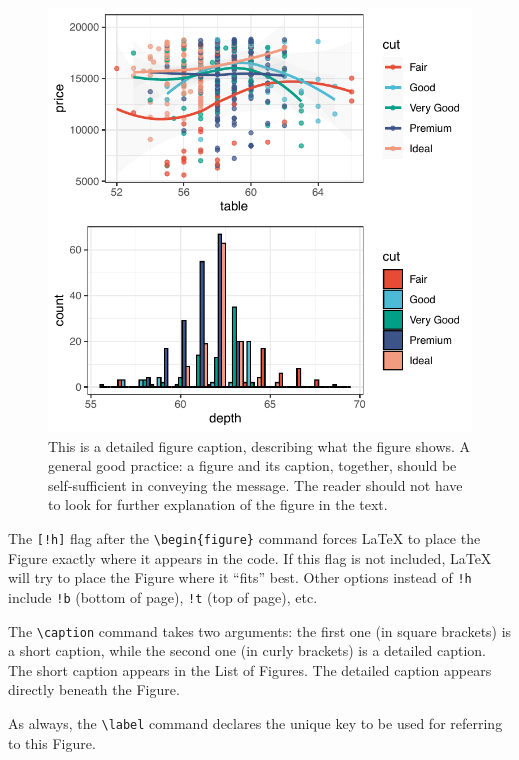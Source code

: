 \begin{figure}[!h]
\centering
\includegraphics[width=0.7\linewidth]{"ch01/Some_Plot"}
\caption[A figure]{This is a detailed figure caption, describing what the figure shows. A general good practice: a figure and its caption, together, should be self-sufficient in conveying the message. The reader should not have to look for further explanation of the figure in the text.}
\label{fig:plot-label}
\end{figure}

The \verb|[!h]| flag after the \verb|\begin{figure}| command forces \LaTeX{} to place the Figure exactly where it appears in the code. If this flag is not included, \LaTeX{} will try to place the Figure where it ``fits'' best. Other options instead of \verb|!h| include \verb|!b| (bottom of page), \verb|!t| (top of page), etc.

The \verb|\caption| command takes two arguments: the first one (in square brackets) is a short caption, while the second one (in curly brackets) is a detailed caption. The short caption appears in the List of Figures. The detailed caption appears directly beneath the Figure.

As always, the \verb|\label| command declares the unique key to be used for referring to this Figure.


